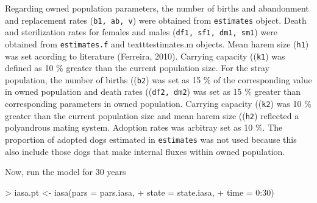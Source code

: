 \documentclass[a4paper]{article}
\begin{document}
Regarding owned population parameters, the number of births and abandonment and replacement rates (\texttt{b1, ab, v}) were obtained from \texttt{estimates} object. Death and sterilization rates for females and males (\texttt{df1, sf1, dm1, sm1}) were obtained from \texttt{estimates.f} and texttt{estimates.m} objects. Mean harem size (\texttt{h1}) was set acording to literature (Ferreira, 2010). Carrying capacity ((\texttt{k1}) was defined as 10 \% greater than the current population size. For the stray population, the number of births ((\texttt{b2}) was set as 15 \% of the corresponding value in owned population and death rates ((\texttt{df2, dm2}) was set as 15 \% greater than corresponding parameters in owned population. Carrying capacity ((\texttt{k2}) was 10 \% greater than the current population size and mean harem size ((\texttt{h2}) reflected a polyandrous mating system. Adoption rates was arbitray set as 10 \%. The proportion of adopted dogs estimated in \texttt{estimates} was not used because this also include those dogs that make internal fluxes within owned population.



Now, run the model for 30 years
\begin{Schunk}
\begin{Sinput}
> iasa.pt <- iasa(pars = pars.iasa,
+                 state = state.iasa,
+                 time = 0:30)
\end{Sinput}
\end{Schunk}
\end{document}
